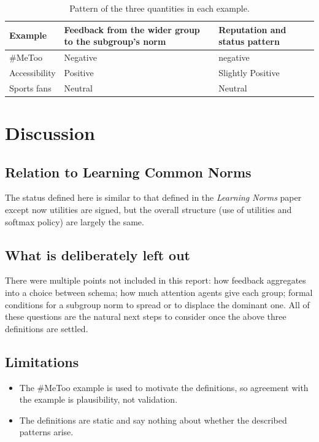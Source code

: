 \documentclass[11pt]{article}
\theoremstyle{definition}
\theoremstyle{remark}
\begin{document}
\begin{table}[h]
\centering
\begin{tabular}{p{3cm}p{5cm}p{6cm}}
\toprule
Example & Feedback from the wider group to the subgroup's norm & Reputation and status pattern \\
\midrule
\#MeToo         & Negative & negative \\
Accessibility   & Positive & Slightly Positive \\
Sports fans  & Neutral & Neutral \\
\bottomrule
\end{tabular}
\caption{Pattern of the three quantities in each example.}
\end{table}

\section{Discussion}

\subsection{Relation to Learning Common Norms}
The status defined here is similar to that defined in the \textit{Learning Norms} paper except now utilities are signed, but the overall structure
(use of utilities and softmax policy) are largely the same.

\subsection{What is deliberately left out}
There were multiple points not included in this report: how feedback aggregates into a choice
between schema; how much attention agents give each group; formal conditions for a subgroup norm
to spread or to displace the dominant one. All of these questions are the natural next steps to consider once
the above three definitions are settled.

\subsection{Limitations}
\begin{itemize}[nosep]
  \item The \#MeToo example is used to motivate the definitions, so agreement with the example is plausibility, not validation.
  \item The definitions are static and say nothing about whether the described patterns arise.
\end{itemize}
\end{document}
